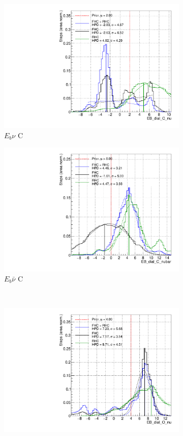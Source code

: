 \begin{figure}
\centering
\begin{subfigure}{.48\textwidth}
  \centering
  \includegraphics[width=0.73\linewidth]{figs/FHCRHC_EB_dial_C_nu}
  \caption{$E_{b}\nu$ C}
\end{subfigure}
\begin{subfigure}{.48\textwidth}
  \centering
  \includegraphics[width=0.73\linewidth]{figs/FHCRHC_EB_dial_C_nubar}
  \caption{$E_{b}\bar{\nu}$ C}
\end{subfigure} \\
\begin{subfigure}{.48\textwidth}
  \centering
  \includegraphics[width=0.73\linewidth]{figs/FHCRHC_EB_dial_O_nu}

\end{subfigure}
\end{figure}
